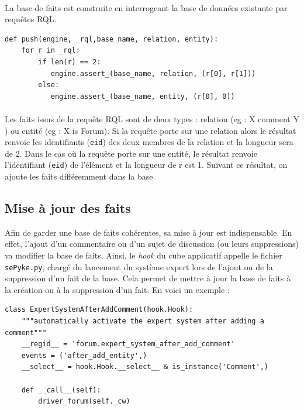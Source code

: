 \documentclass {report}
\begin{document}
\paragraph{}
La base de faits est construite en interrogeant la base de données existante par requêtes RQL.
\renewcommand{\lstlistingname}{Code}
\begin{lstlisting}[caption= Création de la base de faits]
def push(engine, _rql,base_name, relation, entity):
    for r in _rql:
        if len(r) == 2:
           engine.assert_(base_name, relation, (r[0], r[1]))
        else:
           engine.assert_(base_name, entity, (r[0], 0))        
\end{lstlisting}
\paragraph{}
Les faits issus de la requête RQL sont de deux types : relation (eg : X comment Y ) ou entité (eg : X is Forum). Si la requête porte sur une relation alors le résultat renvoie les identifiants (\verb+eid+) des deux membres de la relation et la longueur sera de 2. Dans le cas où la requête porte sur une entité, le résultat renvoie l'identifiant (\verb+eid+) de l'élément et la longueur de r est 1. Suivant ce résultat, on ajoute les faits différemment dans la base.

\subsection{Mise à jour des faits}
Afin de garder une base de faits cohérentes, sa mise à jour est indispensable. En effet, l'ajout d'un commentaire ou d'un sujet de discussion (ou leurs suppressions) va modifier la base de faits. Ainsi, le \textit{hook} du cube applicatif appelle le fichier \verb+sePyke.py+, chargé du lancement du système expert lors de l'ajout ou de la suppression d'un fait de la base. Cela permet de mettre à jour la base de faits à la création ou à la suppression d'un fait. En voici un exemple : 
\begin{lstlisting}[caption= Hook du cube forum gérant l'activation du système expert]
class ExpertSystemAfterAddComment(hook.Hook):
    """automatically activate the expert system after adding a comment"""
    __regid__ = 'forum.expert_system_after_add_comment'
    events = ('after_add_entity',)
    __select__ = hook.Hook.__select__ & is_instance('Comment',)

    def __call__(self):
        driver_forum(self._cw)
\end{lstlisting}
\end{document}
